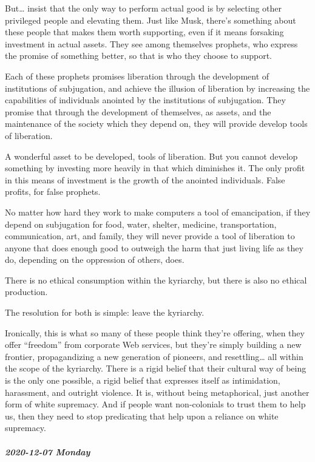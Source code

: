 \documentclass[11pt]{article}
\begin{document}
\begin{itemize}
But… insist that the only way to perform actual good is by selecting other privileged people and elevating them. Just like Musk, there’s something about these people that makes them worth supporting, even if it means forsaking investment in actual assets. They see among themselves prophets, who express the promise of something better, so that is who they choose to support.

Each of these prophets promises liberation through the development of institutions of subjugation, and achieve the illusion of liberation by increasing the capabilities of individuals anointed by the institutions of subjugation. They promise that through the development of themselves, as assets, and the maintenance of the society which they depend on, they will provide develop tools of liberation.

A wonderful asset to be developed, tools of liberation. But you cannot develop something by investing more heavily in that which diminishes it. The only profit in this means of investment is the growth of the anointed individuals. False profits, for false prophets.

No matter how hard they work to make computers a tool of emancipation, if they depend on subjugation for food, water, shelter, medicine, transportation, communication, art, and family, they will never provide a tool of liberation to anyone that does enough good to outweigh the harm that just living life as they do, depending on the oppression of others, does.

There is no ethical consumption within the kyriarchy, but there is also no ethical production.

The resolution for both is simple: leave the kyriarchy.

Ironically, this is what so many of these people think they’re offering, when they offer “freedom” from corporate Web services, but they’re simply building a new frontier, propagandizing a new generation of pioneers, and resettling… all within the scope of the kyriarchy. There is a rigid belief that their cultural way of being is the only one possible, a rigid belief that expresses itself as intimidation, harassment, and outright violence. It is, without being metaphorical, just another form of white supremacy. And if people want non-colonials to trust them to help us, then they need to stop predicating that help upon a reliance on white supremacy.
\end{itemize}
\subparagraph*{2020-12-07 Monday}
\label{sec:orgf8f690e}
\end{document}
